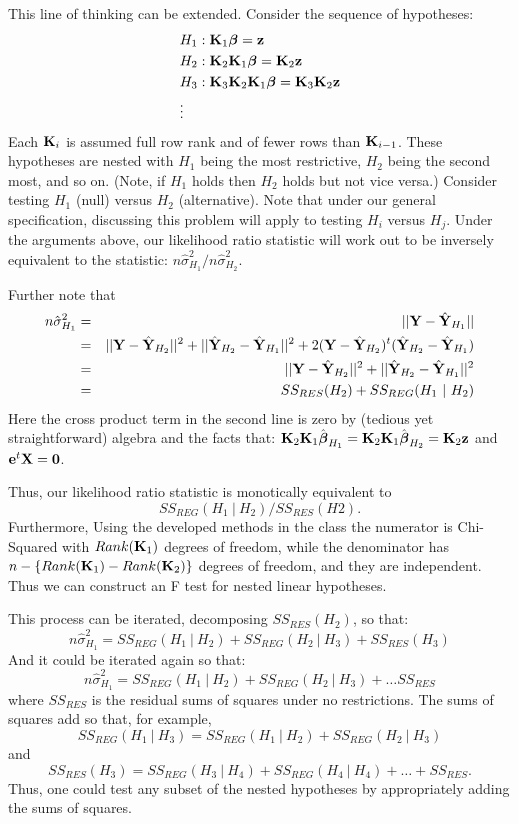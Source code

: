 This line of thinking can be extended. Consider the sequence of hypotheses:
\begin{align*}
 & H_1 :\mathbf{K}_1 \boldsymbol{\beta} = \mathbf{z} \\
 & H_2 :\mathbf{K}_2 \mathbf{K}_1 \boldsymbol{\beta} = \mathbf{K}_2 \mathbf{z} \\
 & H_3 :\mathbf{K}_3 \mathbf{K}_2 \mathbf{K}_1 \boldsymbol{\beta} = \mathbf{K}_3 \mathbf{K}_2 \mathbf{z} \\
 & \vdots 
\end{align*}
Each $\mathbf{K}_i$ is assumed full row rank and of fewer rows than $\mathbf{K}_{i-1}$. 
These hypotheses are nested with $H_1$ being the most restrictive, $H_2$ being the
second most, and so on. (Note, if $H_1$ holds then $H_2$ holds but not vice versa.)
Consider
testing $H_{1}$ (null) versus $H_{2}$ (alternative). Note that under our
general specification, discussing this problem will apply to testing $H_i$ versus $H_j$. 
Under the arguments
above, our likelihood ratio statistic will work out to be inversely equivalent to
the statistic: $n\hat \sigma^2_{H_1} / n\hat \sigma^2_{H_2}$. 


Further note that
\begin{eqnarray*}
n\hat \sigma^2_{H_1}
& = &||\mathbf{Y} - \hat {\mathbf{Y}}_{H_1}|| \\
& = & ||\mathbf{Y} - \hat {\mathbf{Y}}_{H_2}||^2  + ||\hat {\mathbf{Y}}_{H_2} - \hat {\mathbf{Y}}_{H_1}||^2
+ 2 (\mathbf{Y} - \hat {\mathbf{Y}}_{H_2})^t (\hat {\mathbf{Y}}_{H_2} - \hat {\mathbf{Y}}_{H_1}) \\
& = & ||\mathbf{Y} - \hat {\mathbf{Y}}_{H_2}||^2  + ||\hat {\mathbf{Y}}_{H_2} - \hat {\mathbf{Y}}_{H_1}||^2 \\
& = & SS_{RES}(H_2) + SS_{REG}(H_1 ~|~ H_2)
\end{eqnarray*}
Here the cross product term in the second line is zero by (tedious yet straightforward) algebra
and the facts that:
$\mathbf{K}_2 \mathbf{K}_1 \hat {\boldsymbol{\beta}}_{H_1} = \mathbf{K}_2 \mathbf{K}_1 \hat {\boldsymbol{\beta}}_{H_2} = \mathbf{K}_2 \mathbf{z}$ and $\mathbf{e}^t \mathbf{X} = \mathbf{0}$. 

Thus, our likelihood ratio statistic is monotically equivalent to
$$SS_{REG}(H_1 ~|~ H_2) / SS_{RES}(H2).$$
Furthermore,
Using the developed methods in the class the numerator is Chi-Squared with
$Rank(\mathbf{K}_1)$ degrees of freedom, while the denominator has $n - \{Rank(\mathbf{K}_1) - Rank(\mathbf{K}_2)\}$ 
degrees of freedom, and they are independent. Thus we can construct an F test for nested
linear hypotheses.

This process can be iterated, decomposing $SS_{RES}(H_2)$, so that:
$$
n\hat \sigma^2_{H_1}
= SS_{REG}(H_1 ~|~ H_2) + SS_{REG}(H_2 ~|~ H_3) + SS_{RES}(H_3)
$$
And it could be iterated again so that:
$$
n\hat \sigma^2_{H_1}
= SS_{REG}(H_1 ~|~ H_2) + SS_{REG}(H_2 ~|~ H_3) + \ldots SS_{RES}
$$
where $SS_{RES}$ is the residual sums of squares under no restrictions.
The sums of squares add so that, for example,
$$
SS_{REG}(H_1 ~|~ H_3) = SS_{REG}(H_1 ~|~ H_2) + SS_{REG}(H_2 ~|~ H_3)
$$
and
$$
SS_{RES}(H_3) = SS_{REG}(H_3 ~|~ H_4) + SS_{REG}(H_4 ~|~ H_4) + \ldots + SS_{RES}.
$$
Thus, one could test any subset of the nested hypotheses by appropriately adding the sums of
squares.

